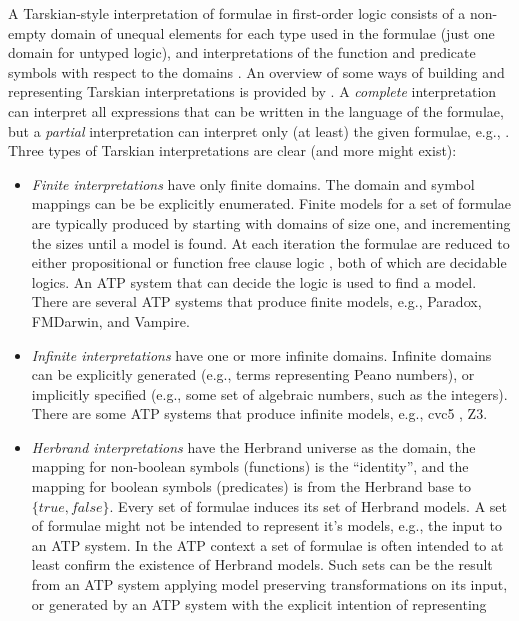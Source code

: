 \documentclass{easychair}
\begin{document}
A Tarskian-style interpretation \cite{TV56} of formulae in first-order logic consists of a 
non-empty domain of unequal elements for each type used in the formulae (just one domain for 
untyped logic), and interpretations of the function and predicate symbols with respect to the 
domains \cite{Hun96,Gal15}.
An overview of some ways of building and representing Tarskian interpretations is provided 
by \cite{CLP04}.
A {\em complete} interpretation can interpret all expressions that can be written in the language 
of the formulae, but a {\em partial} interpretation can interpret only (at least) the 
given formulae, e.g., \cite{BSW23}.
Three types of Tarskian interpretations are clear (and more might exist):
\begin{itemize}
\item {\em Finite interpretations} have only finite domains.
      The domain and symbol mappings can be be explicitly enumerated.
      Finite models for a set of formulae are typically produced by starting with domains of 
      size one, and incrementing the sizes until a model is found.
      At each iteration the formulae are reduced to either propositional \cite{CS03,McC03-MACE4-TR}
      or function free clause logic \cite{BF+09}, both of which are decidable logics.
      An ATP system that can decide the logic is used to find a model.
      There are several ATP systems that produce finite models, e.g., Paradox, FMDarwin, and 
      Vampire.
\item {\em Infinite interpretations} have one or more infinite domains.
      Infinite domains can be explicitly generated (e.g., terms representing Peano numbers), or 
      implicitly specified (e.g., some set of algebraic numbers, such as the integers).
      There are some ATP systems that produce infinite models, e.g., cvc5 \cite{BB+22-cvc5}, Z3.
\item {\em Herbrand interpretations} \cite{Her30} have the Herbrand universe as the domain, 
      the mapping for non-boolean symbols (functions) is the ``identity'', and the mapping
      for boolean symbols (predicates) is from the Herbrand base to $\{true,false\}$.
      Every set of formulae induces its set of Herbrand models.
      A set of formulae might not be intended to represent it's models, e.g., the input to 
      an ATP system. 
      In the ATP context a set of formulae is often intended to at least confirm the existence
      of Herbrand models.
      Such sets can be the result from an ATP system applying model preserving transformations 
      on its input, or generated by an ATP system with the explicit intention of representing 

\end{itemize}
\end{document}
